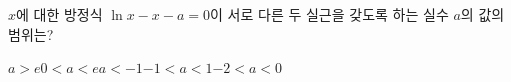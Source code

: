 $x$에 대한 방정식 $\ln x-x-a=0$이 서로 다른 두 실근을 갖도록 하는 실수 $a$의 값의 범위는?
\begin{choices32}{$a>e$}{$0<a<e$}{$a<-1$}{$-1<a<1$}{$-2<a<0$}\end{choices32}
